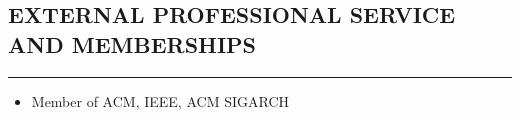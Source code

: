 \documentclass[10pt,a4]{article}
\begin{document}
\subsection*{EXTERNAL PROFESSIONAL SERVICE AND MEMBERSHIPS}
\hrule
\vspace{0.2cm}
\begin{itemize}
	\item Member of ACM, IEEE, ACM SIGARCH
\end{itemize}
\end{document}
